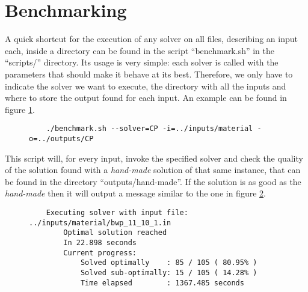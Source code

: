 \section{Benchmarking}
\label{sec:benchmarking}

A quick shortcut for the execution of any solver on all files, describing
an input each, inside a directory can be found in the script ``benchmark.sh''
in the ``scripts/'' directory. Its usage is very simple: each solver is
called with the parameters that should make it behave at its best. Therefore,
we only have to indicate the solver we want to execute, the directory with
all the inputs and where to store the output found for each input. An example
can be found in figure \ref{fig:benchmark-example}.

\begin{figure}[H]
\centering
\begin{verbatim}
	./benchmark.sh --solver=CP -i=../inputs/material -o=../outputs/CP
\end{verbatim}
\label{fig:benchmark-example}
\end{figure}

This script will, for every input, invoke the specified solver and check the
quality of the solution found with a \textit{hand-made} solution of that same
instance, that can be found in the directory ``outputs/hand-made''. If the
solution is as good as the \textit{hand-made} then it will output a message
similar to the one in figure \ref{fig:benchmark-verbose:optimal}.

\begin{figure}[H]
\centering
\begin{verbatim}
	Executing solver with input file: ../inputs/material/bwp_11_10_1.in
		Optimal solution reached
		In 22.898 seconds
		Current progress:
			Solved optimally    : 85 / 105 ( 80.95% )
			Solved sub-optimally: 15 / 105 ( 14.28% )
			Time elapsed        : 1367.485 seconds
\end{verbatim}
\label{fig:benchmark-verbose:optimal}
\end{figure}

